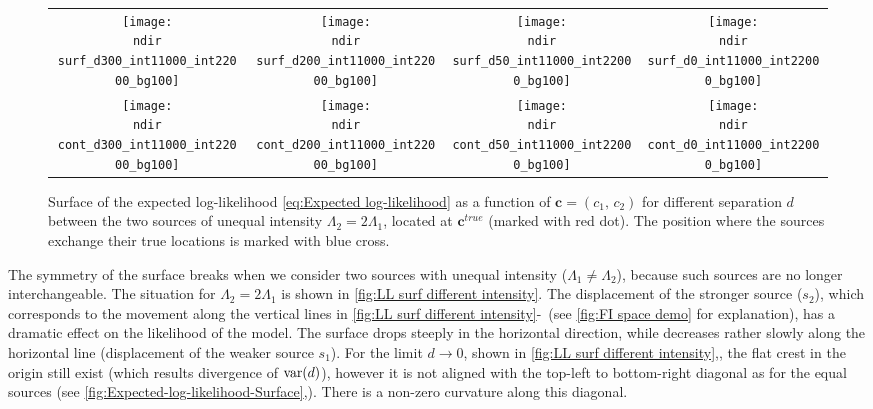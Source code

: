 \begin{figure}[!thb]
	\centering
	\newcommand{\sizeff}{.18}
	\newcommand{\sizegg}{.16}
	\newcommand{\ndir}{\qd gFREM/images/LLsurface/}
	\begin{tabular}{cccc}
		\subfloat[$d=300$ nm]{\texttt{[image: \\ndir surf\_d300\_int11000\_int22000\_bg100]}} 		
		& \subfloat[$d=200$ nm]{\texttt{[image: \\ndir surf\_d200\_int11000\_int22000\_bg100]}} 		
		& \subfloat[$d=50$ nm]{\texttt{[image: \\ndir surf\_d50\_int11000\_int22000\_bg100]}} 		
		& \subfloat[$d=0$ nm]{\texttt{[image: \\ndir surf\_d0\_int11000\_int22000\_bg100]}} 		
		\tabularnewline
		\subfloat[$d=300$ nm]{\texttt{[image: \\ndir cont\_d300\_int11000\_int22000\_bg100]}} 
		& \subfloat[$d=200$ nm]{\texttt{[image: \\ndir cont\_d200\_int11000\_int22000\_bg100]}} 		
		& \subfloat[$d=50$ nm]{\texttt{[image: \\ndir cont\_d50\_int11000\_int22000\_bg100]}} 		
		& \subfloat[$d=0$ nm]{\texttt{[image: \\ndir cont\_d0\_int11000\_int22000\_bg100]}} 		
		\tabularnewline
	\end{tabular}
	\caption{Surface of the expected log-likelihood \autoref{eq:Expected log-likelihood} as a function of $\bm{c}=(c_1,\, c_2)$ for different separation $d$ between the two sources of unequal intensity $\Lambda_2=2\Lambda_1$, located at $\bm{c}^{true}$ (marked with red dot). The position where the sources exchange their true locations is marked with blue cross.}	
	\label{fig:LL surf different intensity}
\end{figure}
%
The symmetry of the surface breaks when we consider two sources with unequal intensity ($\Lambda_1\neq\Lambda_2$), because such sources are no longer interchangeable. The situation for $\Lambda_2=2\Lambda_1$ is shown in \autoref{fig:LL surf different intensity}. The displacement of the stronger source ($s_2$), which corresponds to the movement along the vertical lines in \autoref{fig:LL surf different intensity}\eee-\hhh\ (see \autoref{fig:FI space demo} for explanation), has a dramatic effect on the likelihood of the model. The surface drops steeply in the horizontal direction, while decreases rather slowly along the horizontal line (displacement of the weaker source $s_1$). For the limit $d\rightarrow 0$, shown in \autoref{fig:LL surf different intensity}\ddd,\hhh, the flat crest in the origin still exist (which results divergence of $\mathrm{var}(d)$), however it is not aligned with the top-left to bottom-right diagonal as for the equal sources (see \autoref{fig:Expected-log-likelihood-Surface}\ddd,\hhh). There is a non-zero curvature along this diagonal.

